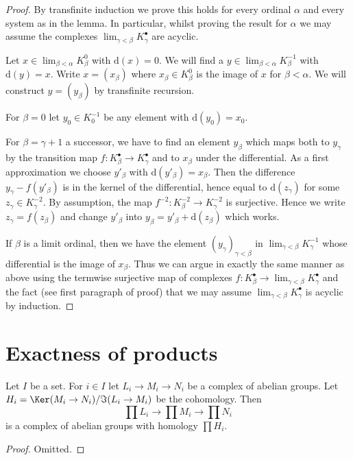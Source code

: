 \begin{proof}
By transfinite induction we prove this holds for every ordinal
$\alpha$ and every system as in the lemma. In particular, whilst
proving the result for $\alpha$ we may assume the complexes
$\lim_{\gamma < \beta} K^\bullet_\gamma$ are acyclic.

\medskip\noindent
Let $x \in \lim_{\beta < \alpha} K^0_\beta$ with $\text{d}(x) = 0$.
We will find a $y \in \lim_{\beta < \alpha} K^{-1}_\beta$
with $\text{d}(y) = x$.
Write $x = (x_\beta)$ where $x_\beta \in K_\beta^0$ is the
image of $x$ for $\beta < \alpha$. We will construct $y = (y_\beta)$
by transfinite recursion.

\medskip\noindent
For $\beta = 0$ let $y_0 \in K_0^{-1}$
be any element with $\text{d}(y_0) = x_0$.

\medskip\noindent
For $\beta = \gamma + 1$ a successor, we have to find an element $y_\beta$
which maps both to $y_\gamma$ by the transition map
$f : K^\bullet_\beta \to K^\bullet_\gamma$ and to $x_\beta$ under the
differential. As a first approximation we choose $y'_\beta$ with
$\text{d}(y'_\beta) = x_\beta$. Then the difference $y_\gamma - f(y'_\beta)$
is in the kernel of the differential, hence equal to $\text{d}(z_\gamma)$
for some $z_\gamma \in K^{-2}_\gamma$.
By assumption, the map $f^{-2} : K^{-2}_\beta \to K^{-2}_\gamma$
is surjective. Hence we write $z_\gamma = f(z_\beta)$
and change $y'_\beta$ into $y_\beta = y'_\beta + \text{d}(z_\beta)$
which works.

\medskip\noindent
If $\beta$ is a limit ordinal, then we have the element
$(y_\gamma)_{\gamma < \beta}$ in $\lim_{\gamma < \beta} K^{-1}_\gamma$
whose differential is the image of $x_\beta$. Thus we can argue in exactly
the same manner as above using the termwise surjective map of complexes
$f : K_\beta^\bullet \to \lim_{\gamma < \beta} K_\gamma^\bullet$
and the fact (see first paragraph of proof) that we may assume
$\lim_{\gamma < \beta} K_\gamma^\bullet$ is acyclic by induction.
\end{proof}


\section{Exactness of products}
\label{section-product-exact}


\begin{lemma}
\label{lemma-product-abelian-groups-exact}
Let $I$ be a set. For $i \in I$ let $L_i \to M_i \to N_i$ be a complex
of abelian groups. Let $H_i = \Ker(M_i \to N_i)/\Im(L_i \to M_i)$
be the cohomology. Then
$$
\prod L_i \to \prod M_i \to \prod N_i
$$
is a complex of abelian groups with homology $\prod H_i$.
\end{lemma}

\begin{proof}
Omitted.
\end{proof}












